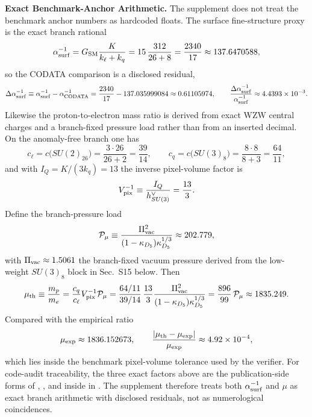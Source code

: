 \documentclass[11pt]{article}
\begin{document}
\medskip
\noindent\textbf{Exact Benchmark-Anchor Arithmetic.}
The supplement does not treat the benchmark anchor numbers as hardcoded floats.
The surface fine-structure proxy is the exact branch rational
\begin{equation}
 \alpha^{-1}_{\rm surf}
 =
 G_{\rm SM}\frac{K}{k_{\ell}+k_q}
 =
 15\,\frac{312}{26+8}
 =
 \frac{2340}{17}
 \approx 137.6470588,
\end{equation}
so the CODATA comparison is a disclosed residual,
\begin{equation}
 \Delta\alpha^{-1}_{\rm surf}
 \equiv
 \alpha^{-1}_{\rm surf}-\alpha^{-1}_{\rm CODATA}
 =
 \frac{2340}{17}-137.035999084
 \approx
 0.61105974,
 \qquad
 \frac{\Delta\alpha^{-1}_{\rm surf}}{\alpha^{-1}_{\rm surf}}
 \approx
 4.4393\times10^{-3}.
\end{equation}
Likewise the proton-to-electron mass ratio is derived from exact WZW central charges and a branch-fixed pressure load rather than from an inserted decimal. On the anomaly-free branch one has
\begin{equation}
 c_{\ell}
 =
 c\bigl(SU(2)_{26}\bigr)
 =
 \frac{3\cdot26}{26+2}
 =
 \frac{39}{14},
 \qquad
 c_q
 =
 c\bigl(SU(3)_{8}\bigr)
 =
 \frac{8\cdot8}{8+3}
 =
 \frac{64}{11},
\end{equation}
and with $I_Q=K/(3k_q)=13$ the inverse pixel-volume factor is
\begin{equation}
 V_{\rm pix}^{-1}
 \equiv
 \frac{I_Q}{h^{\vee}_{SU(3)}}
 =
 \frac{13}{3}.
\end{equation}
Define the branch-pressure load
\begin{equation}
 \mathcal P_{\mu}
 \equiv
 \frac{\Pi_{\rm vac}^2}{(1-\kappa_{D_5})\kappa_{D_5}^{1/3}}
 \approx
 202.779,
\end{equation}
with $\Pi_{\rm vac}\approx1.5061$ the branch-fixed vacuum pressure derived from the low-weight $SU(3)_8$ block in Sec.~S15 below. Then
\begin{equation}
 \mu_{\rm th}
 \equiv
 \frac{m_p}{m_e}
 =
 \frac{c_q}{c_{\ell}}V_{\rm pix}^{-1}\mathcal P_{\mu}
 =
 \frac{64/11}{39/14}\,\frac{13}{3}
 \frac{\Pi_{\rm vac}^2}{(1-\kappa_{D_5})\kappa_{D_5}^{1/3}}
 =
 \frac{896}{99}\,\mathcal P_{\mu}
 \approx
 1835.249.
\end{equation}
Compared with the empirical ratio
\begin{equation}
 \mu_{\rm exp}\approx 1836.152673,
 \qquad
 \frac{|\mu_{\rm th}-\mu_{\rm exp}|}{\mu_{\rm exp}}
 \approx
 4.92\times10^{-4},
\end{equation}
which lies inside the benchmark pixel-volume tolerance used by the verifier. For code-audit traceability, the three exact factors above are the publication-side forms of , , and  inside  in . The supplement therefore treats both $\alpha^{-1}_{\rm surf}$ and $\mu$ as exact branch arithmetic with disclosed residuals, not as numerological coincidences.
\end{document}
